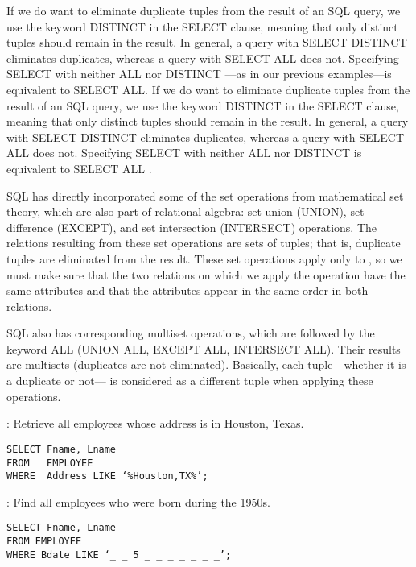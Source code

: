     \par If we do want to eliminate duplicate tuples from the result of an SQL query, we use the keyword DISTINCT in the SELECT clause, meaning that only distinct tuples should remain in the result. In general, a query with SELECT DISTINCT eliminates duplicates, whereas a query with SELECT ALL does not. Specifying SELECT with neither ALL nor DISTINCT —as in our previous examples—is equivalent to SELECT ALL. If we do want to eliminate duplicate tuples from the result of an SQL query, we use the keyword DISTINCT in the SELECT clause, meaning that only distinct tuples should remain in the result. In general, a query with SELECT DISTINCT eliminates duplicates, whereas a query with SELECT ALL does not. Specifying SELECT with neither ALL nor DISTINCT is
equivalent to SELECT ALL .
    \par SQL has directly incorporated some of the set operations from mathematical set
theory, which are also part of relational algebra: set union (UNION), set difference (EXCEPT), and set intersection (INTERSECT) operations. The relations resulting from these set operations are sets of tuples; that is, duplicate tuples are eliminated from the result. These set operations apply only to , so we must make sure that the two relations on which we apply the operation have the same attributes and that the attributes appear in the same order in both relations.
  \par SQL also has corresponding multiset operations, which are followed by the keyword ALL (UNION ALL, EXCEPT ALL, INTERSECT ALL). Their results are multisets (duplicates are not eliminated). Basically, each tuple—whether it is a duplicate or not— is considered as a different tuple when applying these operations.

    \par {}: Retrieve all employees whose address is in Houston, Texas.
      \begin{verbatim}
SELECT Fname, Lname
FROM   EMPLOYEE
WHERE  Address LIKE ‘%Houston,TX%’;
      \end{verbatim}
    \par {}: Find all employees who were born during the 1950s.
      \begin{verbatim}    
SELECT Fname, Lname 
FROM EMPLOYEE
WHERE Bdate LIKE ‘_ _ 5 _ _ _ _ _ _ _’;
      \end{verbatim}

